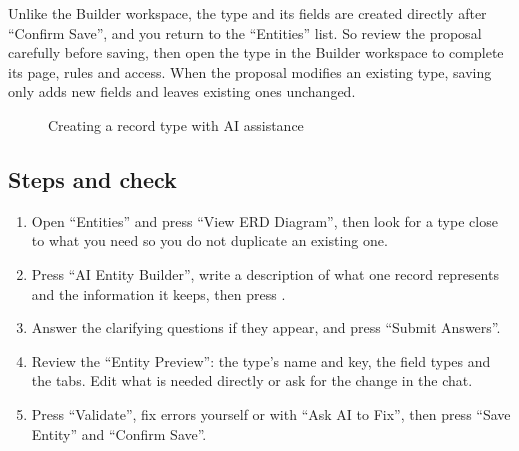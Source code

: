 \begin{rcwarn}
Unlike the Builder workspace, the type and its fields are created directly after “Confirm Save”, and you return to the “Entities” list. So review the proposal carefully before saving, then open the type in the Builder workspace to complete its page, rules and access. When the proposal modifies an existing type, saving only adds new fields and leaves existing ones unchanged.
\end{rcwarn}

\begin{figure}[H]
\centering
{}
\rclegend
\caption{Creating a record type with AI assistance}
\label{fig:builder-ai-builder-flow}
\end{figure}

\subsection{Steps and check}
\begin{enumerate}
\item Open “Entities” and press “View ERD Diagram”, then look for a type close to what you need so you do not duplicate an existing one.
\item Press “AI Entity Builder”, write a description of what one record represents and the information it keeps, then press .
\item Answer the clarifying questions if they appear, and press “Submit Answers”.
\item Review the “Entity Preview”: the type's name and key, the field types and the tabs. Edit what is needed directly or ask for the change in the chat.
\item Press “Validate”, fix errors yourself or with “Ask AI to Fix”, then press “Save Entity” and “Confirm Save”.
\end{enumerate}

